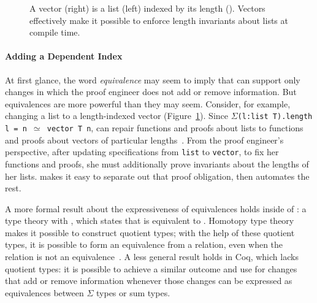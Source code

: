 \begin{figure}
\begin{minipage}{0.44\textwidth}
   
\end{minipage}
\hfill
\begin{minipage}{0.55\textwidth}
   
\end{minipage}
\caption{A vector (right) is a list (left) indexed by its length (). Vectors effectively make it possible to enforce length invariants about lists at compile time.}
\label{fig:listtovect}
\end{figure}

\paragraph{Adding a Dependent Index}
At first glance, the word \textit{equivalence} may seem to imply that \toolnamec can support only changes in
which the proof engineer does not add or remove information.
But equivalences are more powerful than they may seem.
Consider, for example, changing a list to a length-indexed vector (Figure~\ref{fig:listtovect}).
Since $\Sigma$\lstinline{(l:list T).length l = n }$\simeq$\lstinline{ vector T n},
\toolnamec can repair functions and proofs about lists to functions and proofs about vectors of particular lengths~\href{https://github.com/uwplse/pumpkin-pi/blob/v2.0.0/plugin/coq/examples/Example.v}{}. %
From the proof engineer's perspective, after updating specifications from \lstinline{list} to \lstinline{vector},
to fix her functions and proofs, she must additionally prove invariants about the lengths of her lists.
\toolnamec makes it easy to separate out that proof obligation, then automates the rest.

A more formal result about the expressiveness of equivalences holds inside of :
a type theory with , which states that  is equivalent to .
Homotopy type theory makes it possible to construct quotient types;
with the help of these quotient types, it is possible to form an equivalence
from a relation, even when the relation is not an equivalence~\cite{angiuli2020internalizing}.
A less general result holds in Coq, which lacks quotient types:
it is possible to achieve a similar outcome and use \toolnamec for changes that add or remove information
whenever those changes can be expressed as equivalences between $\Sigma$ types or sum types.

